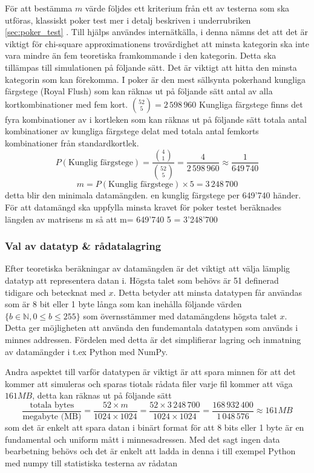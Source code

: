 \documentclass[a4paper]{article}
\begin{document}
För att bestämma $m$ värde följdes ett kriterium från ett av testerna som ska
utföras, klassiskt poker test mer i  detalj beskriven i underrubriken
\ref{sec:poker_test} . Till hjälps användes \parencite{nist} internätkälla, i
denna nämns det att det är viktigt för chi-square approximationens trovärdighet
att minsta kategorin ska inte vara mindre än fem teoretiska framkommande i den
kategorin. Detta ska tillämpas till simulationen på följande sätt. Det är
viktigt att hitta den minsta kategorin som kan förekomma. I poker är den mest
sällsynta pokerhand kungliga färgstege (Royal Flush) som kan räknas ut på
följande sätt antal av alla kortkombinationer med fem kort. $\binom{52}{5} =
2\,598\,960$ Kungliga färgstege finns det fyra  kombinationer av i kortleken
som kan räknas ut på följande sätt totala antal kombinationer av kungliga
färgstege delat med totala antal femkorts kombinationer från standardkortlek.
$$ P(\text{Kunglig färgstege}) =  \frac{\binom{4}{1}}{\binom{52}{5}} =
\frac{4}{2\,598\,960} \approx \frac{1}{649\,740} $$ $$m = P(\text{Kunglig
färgstege})  \times 5 = 3\,248\,700$$ detta blir den minimala datamängden. en
kunglig färgstege per 649'740 händer. För att datamängd ska uppfylla minsta
kravet för poker testet beräknades längden av matrisens m  så att m= 649'740 5
= 3’248’700

\subsubsection{Val av datatyp \& rådatalagring} Efter teoretiska beräkningar av
datamängden är det viktigt att välja lämplig datatyp att representera datan i.
Högsta talet som behövs är 51 definerad tidigare och betecknat med $x$. Detta
betyder att minsta datatypen får användas som är 8 bit eller 1 byte långa som
kan inehålla följande värden $\{b \in \mathbb{N},  0 \leq b \leq 255 \}$ som
överns\-stämmer med datamängdens högsta talet $x$. Detta ger möjligheten att
använda den fundemantala datatypen som används i minnes addressen. Fördelen med
detta är det simplifierar lagring och inmatning av datamängder i t.ex Python
med NumPy.

Andra aspektet till varför datatypen är viktigt är att spara minnen för att det
kommer att simuleras och sparas tiotals rådata filer varje fil kommer att väga
$161 MB$,
detta kan räknas ut på följande sätt
$$ \frac{\text{totala bytes}}{\text{megabyte (MB)}} = \frac{52 \times m }{1024 \times
1024} = \frac{52 \times 3\,248\,700}{1024 \times 1024} = \frac{168\,932\,400}{1\,048\,576} \approx 161 MB 
$$
som det är enkelt att spara datan i binärt format för att 8 bits eller 1 byte
är en fundamental och uniform mått i minnesadressen. Med det sagt ingen data
bearbetning behövs och det är enkelt att ladda in denna i till exempel Python
med numpy till statistiska testerna av rådatan
\end{document}
